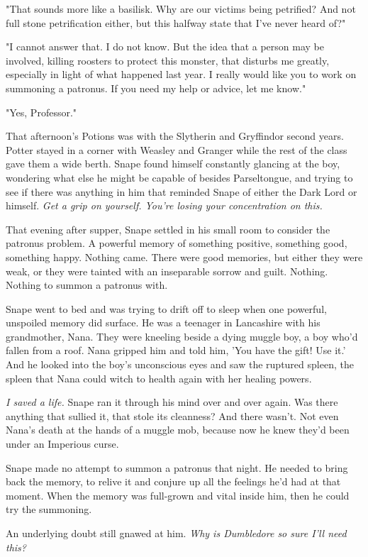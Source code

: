 \documentclass[a4paper,11pt]{article}
\begin{document}
"That sounds more like a basilisk. Why are our victims being petrified? And not full stone petrification either, but this halfway state that I've never heard of?"

"I cannot answer that. I do not know. But the idea that a person may be involved, killing roosters to protect this monster, that disturbs me greatly, especially in light of what happened last year. I really would like you to work on summoning a patronus. If you need my help or advice, let me know."

"Yes, Professor."

That afternoon's Potions was with the Slytherin and Gryffindor second years. Potter stayed in a corner with Weasley and Granger while the rest of the class gave them a wide berth. Snape found himself constantly glancing at the boy, wondering what else he might be capable of besides Parseltongue, and trying to see if there was anything in him that reminded Snape of either the Dark Lord or himself. \emph{Get a grip on yourself. You're losing your concentration on this.}

That evening after supper, Snape settled in his small room to consider the patronus problem. A powerful memory of something positive, something good, something happy. Nothing came. There were good memories, but either they were weak, or they were tainted with an inseparable sorrow and guilt. Nothing. Nothing to summon a patronus with.

Snape went to bed and was trying to drift off to sleep when one powerful, unspoiled memory did surface. He was a teenager in Lancashire with his grandmother, Nana. They were kneeling beside a dying muggle boy, a boy who'd fallen from a roof. Nana gripped him and told him, 'You have the gift! Use it.' And he looked into the boy's unconscious eyes and saw the ruptured spleen, the spleen that Nana could witch to health again with her healing powers.

\emph{I saved a life.} Snape ran it through his mind over and over again. Was there anything that sullied it, that stole its cleanness? And there wasn't. Not even Nana's death at the hands of a muggle mob, because now he knew they'd been under an Imperious curse.

Snape made no attempt to summon a patronus that night. He needed to bring back the memory, to relive it and conjure up all the feelings he'd had at that moment. When the memory was full-grown and vital inside him, then he could try the summoning.

An underlying doubt still gnawed at him. \emph{Why is Dumbledore so sure I'll need this?}
\end{document}
